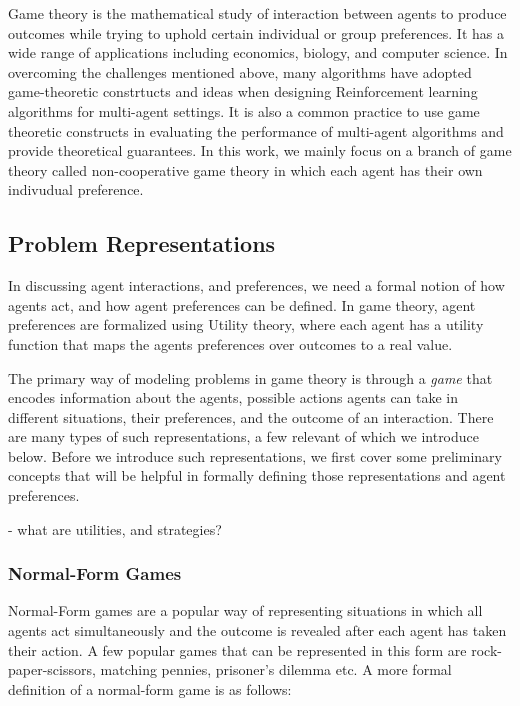 Game theory is the mathematical study of interaction between agents to produce outcomes while
trying to uphold certain individual or group preferences.
It has a wide range of applications including economics, biology, and computer science.
In overcoming the challenges mentioned above, many algorithms have adopted game-theoretic
constrtucts and ideas when designing Reinforcement learning algorithms for multi-agent settings.
It is also a common practice to use game theoretic constructs in evaluating the performance of
multi-agent algorithms and provide theoretical guarantees.
In this work, we mainly focus on a branch of game theory called non-cooperative game theory in
which each agent has their own indivudual preference.

\subsection{Problem Representations}

In discussing agent interactions, and preferences, we need a formal notion of how agents act, and
how agent preferences can be defined.
In game theory, agent preferences are formalized using Utility theory, where each agent has a
utility function that maps the agents preferences over outcomes to a real value.

The primary way of modeling problems in game theory is through a \textit{game} that encodes
information about the agents, possible actions agents can take in different situations, their
preferences, and the outcome of an interaction.
There are many types of such representations, a few relevant of which we introduce below.
Before we introduce such representations, we first cover some preliminary concepts that will be
helpful in formally defining those representations and agent preferences.

- what are utilities, and strategies?

\subsubsection*{Normal-Form Games}

Normal-Form games are a popular way of representing situations in which all agents act
simultaneously and the outcome is revealed after each agent has taken their action.
A few popular games that can be represented in this form are rock-paper-scissors, matching pennies,
prisoner's dilemma etc. A more formal definition of a normal-form game is as follows:

